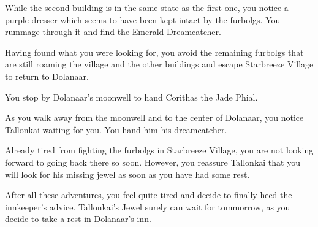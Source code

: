While the second building is in the same state as the first one, you notice a purple dresser which seems to have been kept intact by the furbolgs. You rummage through it and find the Emerald Dreamcatcher.

Having found what you were looking for, you avoid the remaining furbolgs that are still roaming the village and the other buildings and escape Starbreeze Village to return to Dolanaar.

You stop by Dolanaar's moonwell to hand Corithas the Jade Phial.


As you walk away from the moonwell and to the center of Dolanaar, you notice Tallonkai waiting for you. You hand him his dreamcatcher.



Already tired from fighting the furbolgs in Starbreeze Village, you are not looking forward to going back there so soon. However, you reassure Tallonkai that you will look for his missing jewel as soon as you have had some rest.


After all these adventures, you feel quite tired and decide to finally heed the innkeeper's advice. Tallonkai's Jewel surely can wait for tommorrow, as you decide to take a rest in Dolanaar's inn.

